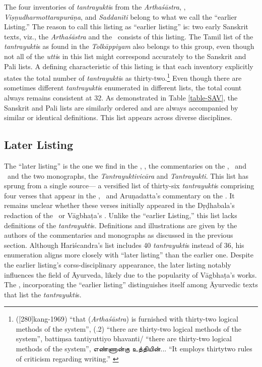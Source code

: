 The four inventories of \emph{tantrayukti}s from the \emph{Arthaśāstra}, \SS, \emph{Viṣṇudharmottarapurāṇa}, and \emph{Saddanīti} belong to what we call the “earlier Listing.” The reason to call this listing as “earlier listing” is: two early Sanskrit texts, viz., the \emph{Arthaśāstra} and the \SS\ consists of this listing. The Tamil list of the \emph{tantrayukti}s as found in the \emph{Tolkāppiyam} also belongs to this group, even though not all of the \emph{utti}s in this list might correspond accurately to the Sanskrit and Pali lists. A defining characteristic of this listing is that each inventory explicitly states the total number of \emph{tantrayukti}s as thirty-two.\footnote{
	 ([280]{kang-1969}) “that (\emph{Arthaśāstra}) is furnished with thirty-two logical methods of the system”,
	 (.2) “there are thirty-two logical methods of the system”,
	battiṃsa tantiyuttiyo bhavanti/ \parencite[\emph{Suttamālā}, 28][920]{smit-1930} “there are thirty-two logical methods of the system”,		
	\texttamil{எண்ணான்கு உத்தியின்}... “It employs thirtytwo rules of criticism regarding writing.” \parencite[9--10]{srip-1995}} 
Even though there are sometimes different \emph{tantrayukti}s enumerated in different lists, the total count always remains consistent at 32. As demonstrated in Table \ref{table-SAV}, the Sanskrit and Pali lists are similarly ordered and are always accompanied by similar or identical definitions. This list appears across diverse disciplines.

\subsection{Later Listing}

The “later listing” is the one we find in the \AS, \CS, the commentaries on the \CS, \AS\ and \AHS\ and the two monographs, the \emph{Tantrayuktivicāra} and \emph{Tantrayukti}. This list has sprung from a single source--- a versified list of thirty-six \emph{tantrayukti}s comprising four verses that appear in the \AS, \CS\ and Aruṇadatta's commentary on the \AHS. It remains unclear whether these verses initially appeared in the Dṛḍhabala's redaction of the \CS\ or Vāgbhaṭa's \AS. Unlike the “earlier Listing,” this list lacks definitions of the \emph{tantrayukti}s. Definitions and illustrations are given by the authors of the commentaries and monographs as discussed in the previous section. Although Hariścandra's list includes 40 \emph{tantrayukti}s instead of 36, his enumeration aligns more closely with “later listing” than the earlier one. Despite the earlier listing's corss-disciplinary appearance, the later listing notably influences the field of Āyurveda, likely due to the popularity of Vāgbhaṭa's works. The \SS, incorporating the “earlier listing” distinguishes itself among Āyurvedic texts that list the \emph{tantrayukti}s.  


